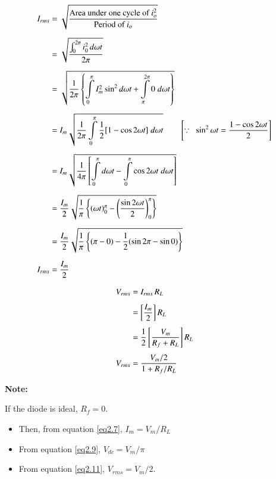 \begin{align}
I_{rms} & = \sqrt{\frac{\text{Area under one cycle of
      $i^2_o$}}{\text{Period of $i_o$}}}\notag\\[5pt]
& = \sqrt{\frac{\int^{2\pi}_0 i^2_0\, d\omega t}{2 \pi}} \notag\\[5pt]
& = \sqrt{\frac{1}{2\pi} \left\{\int\limits^\pi_0 I^2_m \sin^2 d \omega
   t + \int\limits^{2\pi}_\pi 0\; d \omega t\right\}} \notag\\[5pt]
& = I_m \sqrt{\frac{1}{2\pi} \int\limits^\pi_0 \frac{1}{2} [1-\cos 2
    \omega t]\; d \omega t } \qquad \left[\because ~~ \sin^2 \omega t =
  \frac{1 - \cos  2 \omega t}{2} \right] \notag\\[5pt]
& = I_m \sqrt{\frac{1}{4 \pi} \left[\int\limits^\pi_0 d \omega t -
   \int\limits^\pi_0 \cos 2 \omega t\; d \omega t \right]}\notag\\[5pt]
& = \frac{I_m}{2} \sqrt{\frac{1}{\pi} \left\{(\omega t)^\pi_0 - \left(
  \frac{\sin 2 \omega t}{2}  \right)^\pi_0 \right\}} \notag\\[5pt]
& = \frac{I_m}{2} \sqrt{\frac{1}{\pi} \left\{(\pi - 0) - \frac{1}{2}
  (\sin 2 \pi - \sin 0) \right\}} \notag\\[5pt]
I_{rms} & = \frac{I_m}{2}\label{eq2.10}
\end{align}

\eject

\begin{align}
V_{rms} & = I_{rms}\, R_L \notag\\[4pt]
& = \left[\frac{I_m}{2} \right] R_L \notag\\[4pt] 
& = \frac{1}{2} \left[\frac{V_m}{R_f + R_L} \right] R_L \notag\\[4pt]
V_{rms} & = \frac{V_m/2}{1 + R_f /R_L} \label{eq2.11}
\end{align}

\medskip
\noindent\textbf{Note:}

If the diode is ideal, $R_f= 0$.
\begin{itemize}
\itemsep=0pt
\item
Then, from equation \eqref{eq2.7}, $I_m = V_m / R_L$
\item
From equation \eqref{eq2.9}, $V_{dc} = V_m/\pi$
\item
From equation \eqref{eq2.11}, $V_{rms}= V_m /2$.
\end{itemize}

